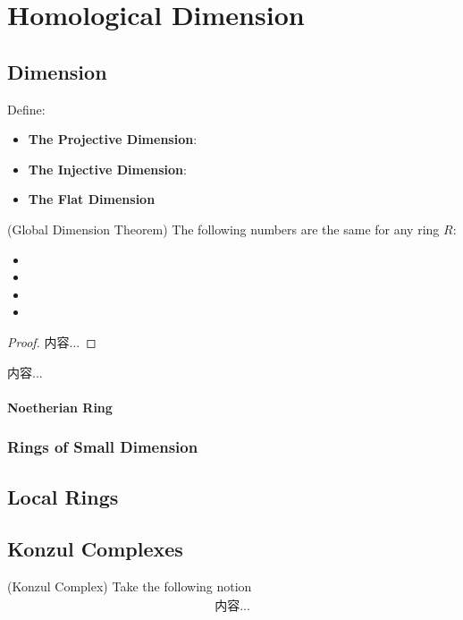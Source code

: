 \documentclass[Total.tex]{subfiles}
\begin{document}
	\chapter{Homological Dimension}
		\section{Dimension}
			Define:
			\begin{Def}
				\begin{itemize}
					\item \textbf{The Projective Dimension}: 
					\item \textbf{The Injective Dimension}:
					\item \textbf{The Flat Dimension}
				\end{itemize}
			\end{Def}
			
			\begin{theorem}
				(Global Dimension Theorem) The following numbers are the same for any ring $R$:
				\begin{itemize}
					\item 
					\item 
					\item 
					\item 
				\end{itemize}
			\end{theorem}
			\begin{proof}
				内容...
			\end{proof}
			\begin{Def}
				内容...
			\end{Def}
			
			\subsubsection{Noetherian Ring}
			\subsection{Rings of Small Dimension}
		\section{Local Rings}
		\section{Konzul Complexes}
			\begin{Def}
				(Konzul Complex) Take the following notion
				\begin{gather*}
					内容...
				\end{gather*}
			\end{Def}
\end{document}
